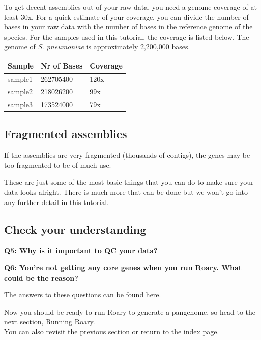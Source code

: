 \documentclass[11pt]{article}
\begin{document}
To get decent assemblies out of your raw data, you need a genome
coverage of at least 30x. For a quick estimate of your coverage, you can
divide the number of bases in your raw data with the number of bases in
the reference genome of the species. For the samples used in this
tutorial, the coverage is listed below. The genome of \textit{S.
pneumoniae} is approximately 2,200,000 bases.

\begin{longtable}[]{@{}lll@{}}
\hline
Sample & Nr of Bases & Coverage\tabularnewline
\hline
\endhead
sample1 & 262705400 & 120x\tabularnewline
sample2 & 218026200 & 99x\tabularnewline
sample3 & 173524000 & 79x\tabularnewline
\hline
\end{longtable}

\hypertarget{fragmented-assemblies}{%
\subsection{Fragmented assemblies}\label{fragmented-assemblies}}

If the assemblies are very fragmented (thousands of contigs), the genes
may be too fragmented to be of much use.

These are just some of the most basic things that you can do to make
sure your data looks alright. There is much more that can be done but we
won't go into any further detail in this tutorial.

\hypertarget{check-your-understanding}{%
\subsection{Check your understanding}\label{check-your-understanding}}

\textbf{Q5: Why is it important to QC your data?}

\textbf{Q6: You're not getting any core genes when you run Roary. What
could be the reason?}

The answers to these questions can be found \href{answers.ipynb}{here}.

    Now you should be ready to run Roary to generate a pangenome, so head to
the next section, \href{run_roary.ipynb}{Running Roary}.\\
You can also revisit the \href{prepare_data.ipynb}{previous section} or
return to the \href{index.ipynb}{index page}.


\end{document}
